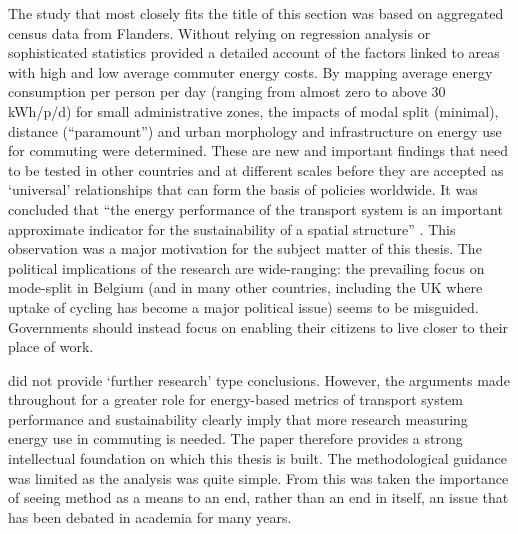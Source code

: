 \documentclass[a4paper, 11pt, twoside]{Thesis}
\begin{document}
The study that most closely fits the title of this section
was based on aggregated census data from Flanders. Without relying on
regression analysis  or sophisticated statistics \citet{Boussauw2009}
provided a detailed account of the factors linked to areas with
high and low average commuter energy costs. By mapping average
energy consumption per person per day (ranging from almost zero
to above 30 kWh/p/d) for small administrative zones, the impacts of
modal split (minimal), distance (``paramount'') and urban morphology and
infrastructure on energy use for commuting were determined. These are new
and important findings that need to be tested in other countries
and at different scales
before they are accepted as `universal' relationships that can form the basis of
policies worldwide. It was concluded that
``the energy performance of the transport system is an important approximate
indicator for the sustainability of a spatial structure'' \citep[590]{Boussauw2009}.
This observation was a major motivation for the subject matter of this thesis.
The political implications of the research are wide-ranging: the prevailing
focus on mode-split in Belgium (and in many other countries, including the
UK where uptake of cycling has become a major political issue) seems to be misguided.
Governments should instead focus on enabling their citizens to live closer to their
place of work.

\citet{Boussauw2009} did not provide `further research' type conclusions. However,
the arguments made throughout for a greater role for energy-based metrics of
transport system performance and sustainability clearly imply that more
research measuring energy use in commuting is needed. The paper therefore
provides a strong intellectual foundation on which this thesis is built.
The methodological guidance was limited as the analysis was quite simple.
From this was taken the importance of seeing method as a means to an end,
rather than an end in itself, an issue that has been debated in academia for
many years. 
\end{document}
